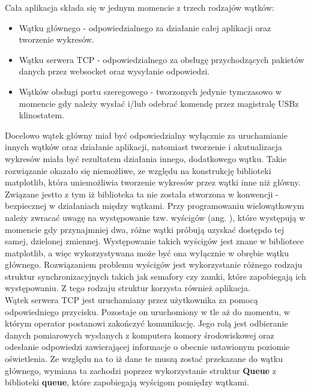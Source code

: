 Cała aplikacja składa się w jednym momencie z trzech rodzajów wątków:
\begin{itemize}
	\item Wątku głównego - odpowiedzialnego za działanie całej aplikacji oraz tworzenie wykresów.
	\item Wątku serwera TCP - odpowiedzialnego za obsługę przychodzących pakietów danych przez websocket oraz wysyłanie odpowiedzi.
	\item Wątków obsługi portu szeregowego - tworzonych jedynie tymczasowo w momencie gdy należy wysłać i/lub odebrać komendę przez magistralę USB\linebreak z klinostatem.
\end{itemize}
Docelowo wątek główny miał być odpowiedzialny wyłącznie za uruchamianie innych wątków oraz działanie aplikacji, natomiast tworzenie i akutualizacja wykresów miała być rezultatem działania innego, dodatkowego wątku. Takie rozwiązanie okazało się niemożliwe, ze względu na konstrukcję biblioteki matplotlib, która uniemożliwia tworzenie wykresów przez wątki inne niż główny. Związane jest\linebreak to z tym iż biblioteka ta nie została stworzona w konwencji  - bezpiecznej w działaniach między wątkami. Przy programowaniu wielowątkowym należy zwracać uwagę na występowanie tzw. wyścigów (ang. ), które występują w momencie gdy przynajmniej dwa, różne wątki próbują uzyskać dostęp\linebreak do tej samej, dzielonej zmiennej. Występowanie takich wyścigów jest znane w bibliotece matplotlib, a więc wykorzystywana może być ona wyłącznie w obrębie wątku głównego. Rozwiązaniem problemu wyścigów jest wykorzystanie różnego rodzaju struktur synchronizacyjnych takich jak semafory czy zamki, które zapobiegają ich występowaniu. Z tego rodzaju struktur korzysta również aplikacja.\\

Wątek serwera TCP jest uruchamiany przez użytkownika za pomocą odpowiedniego przycisku. Pozostaje on uruchomiony w tle aż do momentu, w którym operator postanowi zakończyć komunikację. Jego rolą jest odbieranie danych pomiarowych wysłanych z komputera komory środowiskowej oraz odesłanie odpowiedzi zawierającej informacje o obecnie ustawionym poziomie oświetlenia. Ze względu na to iż dane te muszą zostać przekazane do wątku głównego, wymiana ta zachodzi poprzez wykorzystanie struktur \textbf{Queue} z biblioteki \textbf{queue}, które zapobiegają wyścigom pomiędzy wątkami.\\

